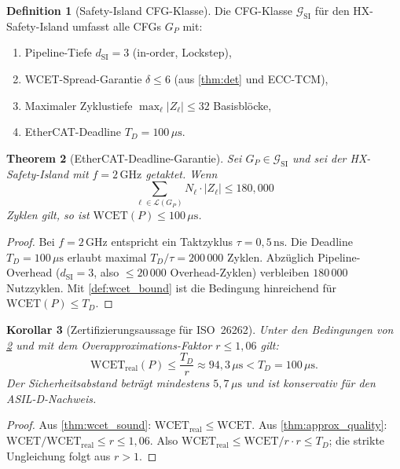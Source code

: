﻿\documentclass[a4paper,12pt]{article}
\theoremstyle{plain}
\newtheorem{theorem}{Theorem}[section]
\newtheorem{corollary}[theorem]{Korollar}
\theoremstyle{definition}
\newtheorem{definition}[theorem]{Definition}
\theoremstyle{remark}
\begin{document}
\begin{definition}[Safety-Island CFG-Klasse]\label{def:si_cfg}
Die CFG-Klasse $\mathcal{G}_\mathrm{SI}$ für den HX-Safety-Island
umfasst alle CFGs $G_P$ mit:
\begin{enumerate}[label=(\roman*)]
  \item Pipeline-Tiefe $d_\mathrm{SI} = 3$ (in-order, Lockstep),
  \item WCET-Spread-Garantie $\delta \leq 6$
        (aus \cref{thm:det} und ECC-TCM),
  \item Maximaler Zyklustiefe $\max_\ell |Z_\ell| \leq 32$ Basisblöcke,
  \item EtherCAT-Deadline $T_D = 100\,\mu\text{s}$.
\end{enumerate}
\end{definition}

\begin{theorem}[EtherCAT-Deadline-Garantie]\label{thm:ethercat}
Sei $G_P \in \mathcal{G}_\mathrm{SI}$ und sei der HX-Safety-Island
mit $f = 2\,\mathrm{GHz}$ getaktet. Wenn
\[
  \sum_{\ell \in \mathcal{L}(G_P)} N_\ell \cdot |Z_\ell| \leq 180{,}000
\]
Zyklen gilt, so ist $\mathrm{WCET}(P) \leq 100\,\mu\text{s}$.
\end{theorem}
\begin{proof}
Bei $f = 2\,\mathrm{GHz}$ entspricht ein Taktzyklus
$\tau = 0{,}5\,\mathrm{ns}$. Die Deadline $T_D = 100\,\mu\text{s}$
erlaubt maximal $T_D / \tau = 200\,000$ Zyklen.
Abzüglich Pipeline-Overhead ($d_\mathrm{SI} = 3$, also $\leq 20\,000$
Overhead-Zyklen) verbleiben $180\,000$ Nutzzyklen.
Mit \cref{def:wcet_bound} ist die Bedingung hinreichend für
$\mathrm{WCET}(P) \leq T_D$.
\end{proof}

\begin{corollary}[Zertifizierungsaussage für ISO~26262]\label{cor:iso_cert}
Unter den Bedingungen von \cref{thm:ethercat} und mit dem
Overapproximations-Faktor $r \leq 1{,}06$ gilt:
\[
  \mathrm{WCET}_\mathrm{real}(P) \leq \frac{T_D}{r} \approx 94{,}3\,\mu\text{s}
  < T_D = 100\,\mu\text{s}.
\]
Der Sicherheitsabstand beträgt mindestens $5{,}7\,\mu\text{s}$
und ist konservativ für den ASIL-D-Nachweis.
\end{corollary}
\begin{proof}
Aus \cref{thm:wcet_sound}: $\mathrm{WCET}_\mathrm{real} \leq \mathrm{WCET}$.
Aus \cref{thm:approx_quality}: $\mathrm{WCET} / \mathrm{WCET}_\mathrm{real} \leq r \leq 1{,}06$.
Also $\mathrm{WCET}_\mathrm{real} \leq \mathrm{WCET} / r \cdot r \leq T_D$;
die strikte Ungleichung folgt aus $r > 1$.
\end{proof}
\end{document}
